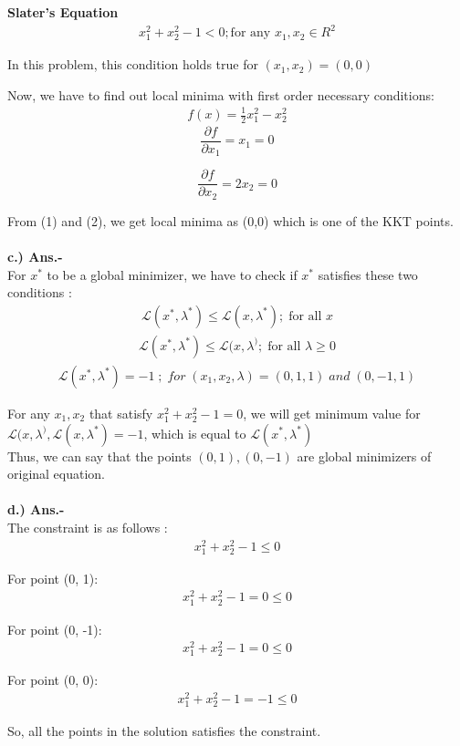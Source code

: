 \documentclass[fleqn]{article}
\begin{document}
\textbf{Slater's Equation}
\begin{align*}
x_1^2 + x_2^2 - 1 < 0 ; \text{for any } x_1,x_2 \in R^2    
\end{align*}

In this problem, this condition holds true for $(x_1,x_2) = (0,0)$

Now, we have to find out local minima with first order necessary conditions:
\begin{align*}
f(x) = \frac{1}{2} x_1^2 - x_2^2
\end{align*}
\begin{equation}
    \frac{\partial f}{\partial x_1} = x_1 = 0    
\end{equation}

\begin{equation}
    \frac{\partial f}{\partial x_2} = 2x_2 = 0
\end{equation}

From (1) and (2), we get local minima as (0,0) which is one of the KKT points.
\\
\\
{\bf c.) Ans.-}
\\

For $x^*$ to be a global minimizer, we have to check if $x^*$ satisfies these two conditions :
\begin{align*}
    \mathcal{L}(x^*, \lambda^*) \le \mathcal{L}(x, \lambda^*) ; \; \text{for all }x
\end{align*}
\begin{align*}
\mathcal{L}(x^*, \lambda^*) \le \mathcal{L}(x, \lambda^) ; \; \text{for all }\lambda \ge 0
\end{align*}
\begin{align*}
\mathcal{L}(x^*, \lambda^*) = -1 \; ; \; for \; (x_1, x_2, \lambda) = (0,1,1) \; and \; (0,-1,1)
\end{align*}

For any $x_1, x_2$ that satisfy $ x_1^2 + x_2^2 - 1 = 0$, we will get minimum value for $\mathcal{L}(x, \lambda^), \mathcal{L}(x, \lambda^*) = -1$, which is equal to $\mathcal{L}(x^*, \lambda^*)$
\\
Thus, we can say that the points $(0,1) , (0,-1) $ are global minimizers of original equation.
\\
\\
{\bf d.) Ans.-}
\\

The constraint is as follows  :
\begin{align*}
x_1^2 + x_2^2 - 1 \le 0
\end{align*}

For point (0, 1):
\begin{align*}
x_1^2 + x_2^2 - 1 = 0 \le 0
\end{align*}

For point (0, -1):
\begin{align*}
x_1^2 + x_2^2 - 1 = 0 \le 0
\end{align*}

For point (0, 0):
\begin{align*}
x_1^2 + x_2^2 - 1 = -1 \le 0
\end{align*}

So, all the points in the solution satisfies the constraint.
\end{document}
